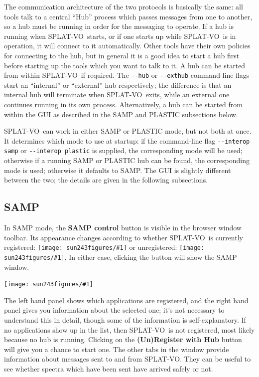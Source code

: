 \documentclass[twoside,11pt]{article}
\newcommand{\htmladdimg}[1]{}
\newcommand{\latexhtml}[2]{#1}
\renewcommand{\_}{\texttt{\symbol{95}}}
\newcommand{\SPLAT}{\textsf{SPLAT-VO}}
\newcommand{\mainfigure}[1]
{\begin{center}
 \latexhtml{\texttt{[image: sun243\_figures/\#1]}}{\htmladdimg{#1.gif}}
 \end{center}
}
\newcommand{\inline}[1]
        {\latexhtml{\texttt{[image: sun243\_figures/\#1]}}
        {\htmladdimg[align=center]{#1.gif}}}
\newcommand{\labelitem}[1]{\textbf{#1}}
\begin{document}
The communication architecture of the two protocols is basically
the same: all tools talk to a central ``Hub'' process which
passes messages from one to another,
so a hub must be running in order for the messaging to operate.
If a hub is running when \SPLAT\ starts, or if one starts up while
\SPLAT\ is in operation, it will connect to it automatically.
Other tools have their own policies for connecting to the hub,
but in general it is a good idea to start a hub first before starting
up the tools which you want to talk to it.
A hub can be started from within \SPLAT\ if required.
The \verb+--hub+ or \verb+--exthub+ command-line flags start
an ``internal'' or ``external'' hub respectively;
the difference is that an internal hub will terminate when \SPLAT\ exits,
while an external one continues running in its own process.
Alternatively, a hub can be started from within the GUI as described
in the SAMP and PLASTIC subsections below.

\SPLAT\ can work in either SAMP or PLASTIC mode, but not both at once.
It determines which mode to use at startup: if the command-line flag
\verb+--interop samp+ or \verb+--interop plastic+ is supplied, the
corresponding mode will be used;
otherwise if a running SAMP or PLASTIC hub can be found, the corresponding
mode is used; otherwise it defaults to SAMP.
The GUI is slightly different between the two;
the details are given in the following subsections.

\newpage
\subsection{SAMP}

In SAMP mode, the \labelitem{SAMP control} button is visible in the
browser window toolbar.  Its appearance changes according to whether
\SPLAT\ is currently registered: \inline{sampgo} or
unregistered: \inline{samp}.
In either case, clicking the button will show the SAMP window.

\mainfigure{sampwindow}

The left hand panel shows which applications are registered,
and the right hand panel gives you information about the selected one;
it's not necessary to understand this in detail, though
some of the information is self-explanatory.
If no applications show up in the list, then \SPLAT\ is not registered,
most likely because no hub is running.  Clicking on the
\labelitem{(Un)Register with Hub} button will give you a chance to start one.
The other tabs in the window provide information about messages
sent to and from \SPLAT.  They can be useful to
see whether spectra which have been sent have arrived safely or not.
\end{document}
